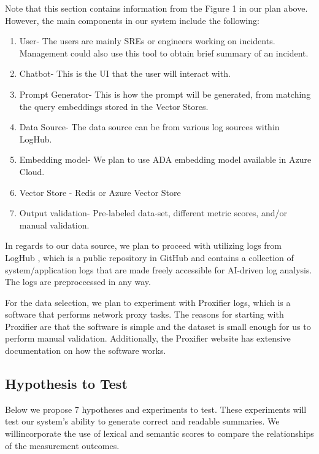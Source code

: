 \documentclass[conference]{IEEEtran}
\begin{document}
Note that this section contains information from the Figure 1 in our plan above. However, the main components in our system include the following:

\begin{enumerate}
    \item User- The users are mainly SREs or engineers working on incidents. Management could also use this tool to obtain brief summary of an incident.
    \item Chatbot- This is the UI that the user will interact with.
    \item Prompt Generator- This is how the prompt will be generated, from matching the query embeddings stored in the Vector Stores.
    \item Data Source- The data source can be from various log sources within LogHub.
    \item Embedding model- We plan to use ADA embedding model available in Azure Cloud.
    \item Vector Store - Redis or Azure Vector Store
    \item Output validation- Pre-labeled data-set, different metric scores, and/or manual validation.
\end{enumerate}

In regards to our data source, we plan to proceed with utilizing logs from LogHub \cite{zhu2023loghub}, which is a public repository in GitHub and contains a collection of system/application logs that are made freely accessible for AI-driven log analysis. The logs are preproccessed in any way.

For the data selection, we plan to experiment with Proxifier logs, which is a software that performs network proxy tasks. The reasons for starting with Proxifier are that the software is simple and the dataset is small enough for us to perform manual validation. Additionally, the Proxifier website has extensive documentation on how the software works.

\subsection{Hypothesis to Test}\label{AA}

Below we propose 7 hypotheses and experiments to test. These experiments will test our system's ability to generate correct and readable summaries. We willincorporate the use of lexical and semantic scores to compare the relationships of the measurement outcomes.
\end{document}
